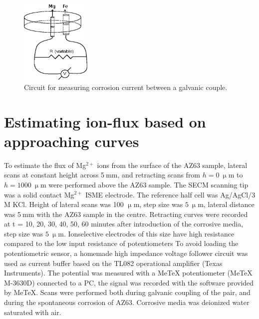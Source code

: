 \begin{figure}
\centering
\includegraphics[width=0.3\textwidth]{img/corrosion_current.eps}
\caption[Circuit for measuring corrosion current between a galvanic couple.]{Circuit for measuring corrosion current between a galvanic couple.}

\label{fig:corrosion_current}
\end{figure}


	\section{Estimating ion-flux based on approaching curves}
To estimate the flux of Mg$^{2+}$ ions from the surface of the AZ63 sample, lateral scans at constant height across 5$~$mm, and retracting scans from $h=0~\upmu$m to $h=1000~\upmu$m were performed above the AZ63 sample.
The SECM scanning tip was a solid contact Mg$^{2+}$ ISME electrode.
The reference half cell was Ag/AgCl/3 M KCl.
Height of lateral scans was 100 $\upmu$m, step size was $5~\upmu$m, lateral distance was 5$~$mm with the AZ63 sample in the centre.
Retracting curves were recorded at t = 10, 20, 30, 40, 50, 60 minutes after introduction of the corrosive media, step size was $5~\upmu$m.
Ionselective electrodes of this size have high resistance compared to the low input resistance of potentiometers
To avoid loading the potentiometric sensor, a homemade high impedance voltage follower circuit was used as current buffer based on the TL082 operational amplifier (Texas Instruments).
The potential was measured with a MeTeX potentiometer (MeTeX M-3630D) connected to a PC, the signal was recorded with the software provided by MeTeX.
Scans were performed both during galvanic coupling of the pair, and during the spontaneous corrosion of AZ63.
Corrosive media was deionized water saturated with air.
